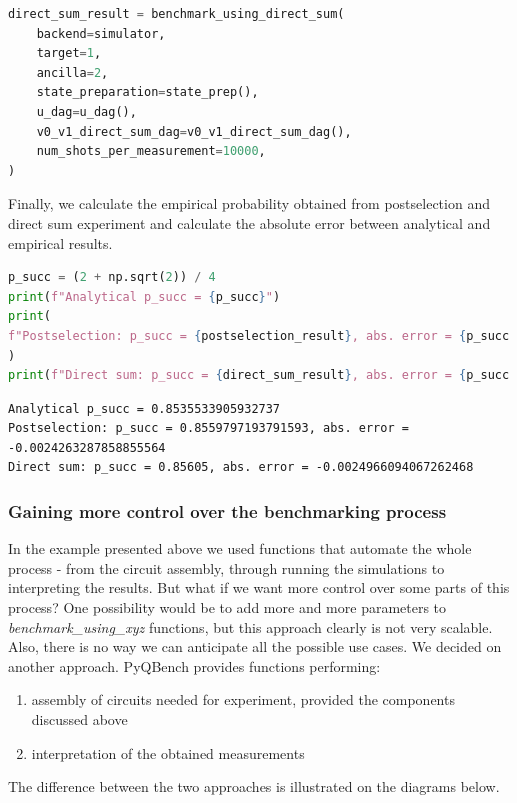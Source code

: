 \documentclass[preprint,12pt, a4paper, dvipsnames]{elsarticle}
\newcommand{\1}{{\rm 1\hspace{-0.9mm}l}}
\begin{document}
\begin{lstlisting}[language=Python, caption=Simulation benchmark by using direct sum]
direct_sum_result = benchmark_using_direct_sum(
	backend=simulator,
	target=1,
	ancilla=2,
	state_preparation=state_prep(),
	u_dag=u_dag(),
	v0_v1_direct_sum_dag=v0_v1_direct_sum_dag(),
	num_shots_per_measurement=10000,
)
\end{lstlisting}
Finally, we calculate the empirical probability obtained from postselection and direct sum experiment and calculate the absolute error between analytical and empirical results. 
\begin{lstlisting}[language=Python, caption=Computation of probability]
p_succ = (2 + np.sqrt(2)) / 4
print(f"Analytical p_succ = {p_succ}")
print(
f"Postselection: p_succ = {postselection_result}, abs. error = {p_succ - postselection_result}"
)
print(f"Direct sum: p_succ = {direct_sum_result}, abs. error = {p_succ - direct_sum_result}")

\end{lstlisting}


\begin{lstlisting}
Analytical p_succ = 0.8535533905932737
Postselection: p_succ = 0.8559797193791593, abs. error = -0.0024263287858855564
Direct sum: p_succ = 0.85605, abs. error = -0.0024966094067262468
\end{lstlisting}


\subsubsection{Gaining more control over the benchmarking process}
In the example presented above we used functions that automate the whole process - from the circuit assembly, through running the simulations to interpreting the results. But what if we want more control over some parts of this process? 
One possibility would be to add more and more parameters to \textit{benchmark\_using\_xyz} functions, but this approach clearly is not very scalable. Also, there is no way we can anticipate all the possible use cases.
 We decided on another approach.  PyQBench provides functions performing:
\begin{enumerate}
\item assembly of circuits needed for experiment, provided the components discussed above
\item interpretation of the obtained measurements
\end{enumerate}
 The difference between the two approaches is illustrated on the diagrams below.
\end{document}
